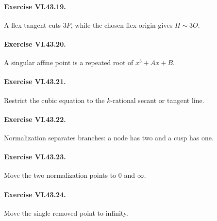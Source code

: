 \paragraph{Exercise VI.43.19.}
\begin{hint}
A flex tangent cuts \(3P\), while the chosen flex origin gives \(H\sim3O\).
\end{hint}

\paragraph{Exercise VI.43.20.}
\begin{hint}
A singular affine point is a repeated root of \(x^3+Ax+B\).
\end{hint}

\paragraph{Exercise VI.43.21.}
\begin{hint}
Restrict the cubic equation to the \(k\)-rational secant or tangent line.
\end{hint}

\paragraph{Exercise VI.43.22.}
\begin{hint}
Normalization separates branches: a node has two and a cusp has one.
\end{hint}

\paragraph{Exercise VI.43.23.}
\begin{hint}
Move the two normalization points to \(0\) and \(\infty\).
\end{hint}

\paragraph{Exercise VI.43.24.}
\begin{hint}
Move the single removed point to infinity.
\end{hint}
